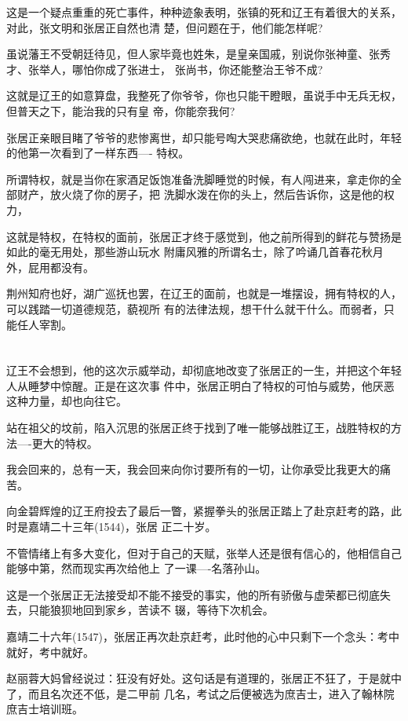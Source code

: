 \documentclass[11pt,a4paper,onecolumn]{article}
\begin{document}
这是一个疑点重重的死亡事件，种种迹象表明，张镇的死和辽王有着很大的关系，对此，张文明和张居正自然也清
楚，但问题在于，他们能怎样呢?

虽说藩王不受朝廷待见，但人家毕竟也姓朱，是皇亲国戚，别说你张神童、张秀才、张举人，哪怕你成了张进士，
张尚书，你还能整治王爷不成?

这就是辽王的如意算盘，我整死了你爷爷，你也只能干瞪眼，虽说手中无兵无权，但普天之下，能治我的只有皇
帝，你能奈我何?

张居正亲眼目睹了爷爷的悲惨离世，却只能号啕大哭悲痛欲绝，也就在此时，年轻的他第一次看到了一样东西----
特权。

所谓特权，就是当你在家酒足饭饱准备洗脚睡觉的时候，有人闯进来，拿走你的全部财产，放火烧了你的房子，把
洗脚水泼在你的头上，然后告诉你，这是他的权力，

这就是特权，在特权的面前，张居正才终于感觉到，他之前所得到的鲜花与赞扬是如此的毫无用处，那些游山玩水
附庸风雅的所谓名士，除了吟诵几首春花秋月外，屁用都没有。

荆州知府也好，湖广巡抚也罢，在辽王的面前，也就是一堆摆设，拥有特权的人，可以践踏一切道德规范，藐视所
有的法律法规，想干什么就干什么。而弱者，只能任人宰割。

\section[\thesection]{}

辽王不会想到，他的这次示威举动，却彻底地改变了张居正的一生，并把这个年轻人从睡梦中惊醒。正是在这次事
件中，张居正明白了特权的可怕与威势，他厌恶这种力量，却也向往它。

站在祖父的坟前，陷入沉思的张居正终于找到了唯一能够战胜辽王，战胜特权的方法----更大的特权。

我会回来的，总有一天，我会回来向你讨要所有的一切，让你承受比我更大的痛苦。

向金碧辉煌的辽王府投去了最后一瞥，紧握拳头的张居正踏上了赴京赶考的路，此时是嘉靖二十三年(1544)，张居
正二十岁。

不管情绪上有多大变化，但对于自己的天赋，张举人还是很有信心的，他相信自己能够中第，然而现实再次给他上
了一课----名落孙山。

这是一个张居正无法接受却不能不接受的事实，他的所有骄傲与虚荣都已彻底失去，只能狼狈地回到家乡，苦读不
辍，等待下次机会。

嘉靖二十六年(1547)，张居正再次赴京赶考，此时他的心中只剩下一个念头：考中就好，考中就好。

赵丽蓉大妈曾经说过：狂没有好处。这句话是有道理的，张居正不狂了，于是就中了，而且名次还不低，是二甲前
几名，考试之后便被选为庶吉士，进入了翰林院庶吉士培训班。
\end{document}
